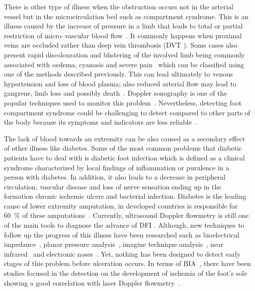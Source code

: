 There is other type of illness when the obstruction occurs not in the arterial vessel but in the microcirculation bed such as compartment syndrome. This is an illness caused by the increase of pressure in a limb that leads to total or partial restriction of micro–vascular blood flow~\cite{songer2001tissue}. It commonly happens when proximal veins are occluded rather than deep vein thrombosis (DVT ). Some cases also present rapid discolouration and blistering of the involved limb being commonly associated with oedema, cyanosis and severe pain~\cite{chhabra2013compartment} which can be classified using one of the methods described previously. This can lead ultimately to venous hypertension and loss of blood plasma; also reduced arterial flow may lead to gangrene, limb loss and possibly death~\cite{lamborn2014compartment}. Doppler sonography is one of the popular techniques used to monitor this problem~\cite{chhabra2013compartment}. Nevertheless, detecting foot compartment syndrome could be challenging to detect compared to other parts of the body because its symptoms and indicators are less reliable~\cite{dodd2013foot}.  

The lack of blood towards an extremity can be also caused as a secondary effect of other illness like diabetes. Some of the most common problems that diabetic patients have to deal with is diabetic foot infection which is defined as a clinical syndrome characterized by local findings of inflammation or purulence in a person with diabetes. In addition, it also leads to a decrease in peripheral circulation, vascular disease and loss of nerve sensation ending up in the formation chronic ischemic ulcers and bacterial infection. Diabetes is the leading cause of lower extremity amputation, in developed countries is responsible for \SI{60}{\percent} of these amputations~\cite{ucckay2014diabetic}.  Currently, ultrasound Doppler flowmetry is still one of the main tools to diagnose the advance of DFI . Although, new techniques to follow up the progress of this illness have been researched such as bioelectrical impedance~\cite{cheng2012application}, planar pressure analysis~\cite{dos2010insole}, imagine technique analysis~\cite{songer2001tissue}, near infrared~\cite{papazoglou2008assessment} and electronic noses~\cite{yusuf2013diagnosis}. Yet, nothing has been designed to detect early stages of this problem before ulceration occurs. In terms of BIA~, there have been studies focused in the detection on the development of ischemia of the foot's sole showing a good correlation with laser Doppler flowmetry~\cite{cheng2012application}. 

